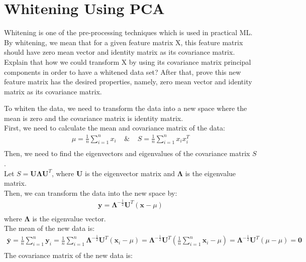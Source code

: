 \documentclass[12pt]{article}
\begin{document}
\section{Whitening Using PCA}
Whitening is one of the pre-processing techniques which is used in practical ML. By whitening,
we mean that for a given feature matrix X, this feature matrix should have zero mean vector
and identity matrix as its covariance matrix. Explain that how we could transform X by using
its covariance matrix principal components in order to have a whitened data set? After that,
prove this new feature matrix has the desired properties, namely, zero mean vector and identity
matrix as its covariance matrix.
\begin{qsolve}
    To whiten the data, we need to transform the data into a new space where the mean is zero and the covariance matrix is identity matrix.\\
    First, we need to calculate the mean and covariance matrix of the data:
    \begin{gather*}
        \mu = \frac{1}{n} \sum_{i=1}^{n} x_{i} \; \; \; \; \& \; \; \; \;
        S = \frac{1}{n} \sum_{i=1}^{n} x_{i} x_{i}^T \\
    \end{gather*}
    \splitqsolve
    Then, we need to find the eigenvectors and eigenvalues of the covariance matrix $S$.\\
    Let $S = \mathbf{U} \mathbf{\Lambda} \mathbf{U}^T$, where $\mathbf{U}$ is the eigenvector matrix and $\mathbf{\Lambda}$ is the eigenvalue matrix.\\
    Then, we can transform the data into the new space by:
    \begin{gather*}
        \mathbf{y} = \mathbf{\Lambda}^{-\frac{1}{2}} \mathbf{U}^T (\mathbf{x} - \mu) \\
    \end{gather*}
    where $\mathbf{\Lambda}$ is the eigenvalue vector.\\
    The mean of the new data is:
    \begin{gather*}
        \bar{\mathbf{y}} = \frac{1}{n} \sum_{i=1}^{n} \mathbf{y}_{i} = \frac{1}{n} \sum_{i=1}^{n} \mathbf{\Lambda}^{-\frac{1}{2}} \mathbf{U}^T (\mathbf{x}_{i} - \mu) = \mathbf{\Lambda}^{-\frac{1}{2}} \mathbf{U}^T (\frac{1}{n} \sum_{i=1}^{n} \mathbf{x}_{i} - \mu) = \mathbf{\Lambda}^{-\frac{1}{2}} \mathbf{U}^T (\mu - \mu) = \mathbf{0} \\
    \end{gather*}
    The covariance matrix of the new data is:

\end{qsolve}
\end{document}
